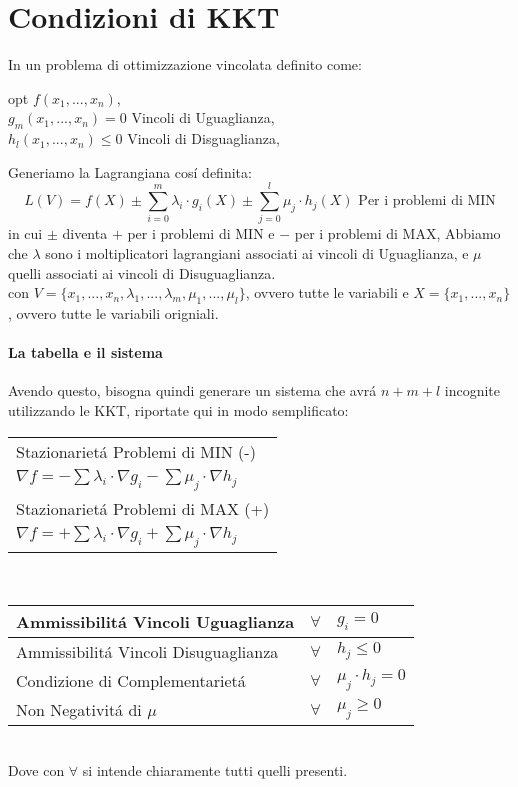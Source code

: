 \documentclass[12pt, a4paper, openany]{book}
\begin{document}
\section{Condizioni di KKT}
In un problema di ottimizzazione vincolata definito come:
\begin{center}
    opt $f(x_1,...,x_n)$,
    \\
    $g_m(x_1,...,x_n) = 0$ Vincoli di Uguaglianza,
    \\
    $h_l(x_1,...,x_n) \leq 0$ Vincoli di Disguaglianza,
\end{center}
Generiamo la Lagrangiana cosí definita:
\[
    L(V) = f(X) \pm \sum_{i=0}^{m} \lambda_i \cdot g_i(X) \pm \sum_{j=0}^{l} \mu_j \cdot h_j(X) \text{ Per i problemi di MIN}
\]
in cui $\pm$ diventa $+$ per i problemi di MIN e $-$ per i problemi di MAX, 
Abbiamo che $\lambda$ sono i moltiplicatori lagrangiani associati ai vincoli di Uguaglianza, e $\mu$ quelli associati ai vincoli di Disuguaglianza.
\\\small{con $V=\{x_1,...,x_n,\lambda_1,...,\lambda_m, \mu_1,...,\mu_l\}$, ovvero tutte le variabili e $X=\{x_1,...,x_n\}$, ovvero tutte le variabili origniali.}

\paragraph{La tabella e il sistema}
Avendo questo, bisogna quindi generare un sistema che avrá $n+m+l$ incognite utilizzando le KKT,
riportate qui in modo semplificato:\\
\begin{tabularx}{\textwidth}{|Y|}
    \hline
    Stazionarietá Problemi di MIN (-)\\
        $ \nabla f = - \sum \lambda_i \cdot \nabla g_i - \sum \mu_j \cdot \nabla h_j$ \\
    \hline \hline
    Stazionarietá Problemi di MAX (+)\\
        $ \nabla f = + \sum \lambda_i \cdot \nabla g_i + \sum \mu_j \cdot \nabla h_j$ \\
    \hline
\end{tabularx}\\
\begin{tabularx}{\textwidth}{|l|cY|}
    \hline
    Ammissibilitá Vincoli Uguaglianza &  $\forall$ & $ g_i = 0$\\
    \hline
    Ammissibilitá Vincoli Disuguaglianza &  $ \forall$ & $ h_j\leq 0$\\
    \hline
    Condizione di Complementarietá & $\forall$ & $ \mu_j \cdot h_j = 0$ \\ 
    \hline
    Non Negativitá di $\mu$ &$\forall $ & $ \mu_j \geq 0$\\
    \hline   
\end{tabularx}
\\Dove con $\forall$ si intende chiaramente tutti quelli presenti.
\end{document}

